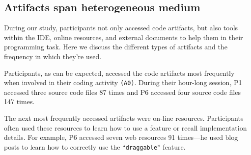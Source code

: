 




\subsection{Artifacts span heterogeneous medium}
During our study, participants not only accessed code artifacts, but also tools within the IDE, online resources, and external documents to help them in their programming task. Here we discuss the different types of artifacts and the frequency in which they're used.

Participants, as can be expected, accessed the code artifacts most frequently when involved in their coding activity \texttt{(A0)}. During their hour-long session, P1 accessed three source code files 87 times and P6 accessed four source code files 147 times. 

The next most frequently accessed artifacts were on-line resources. Participants often used these resources to learn how to use a feature or recall implementation details. For example, P6 accessed seven web resources 91 times---he used blog posts to learn how to correctly use the ``\texttt{draggable}'' feature. 

